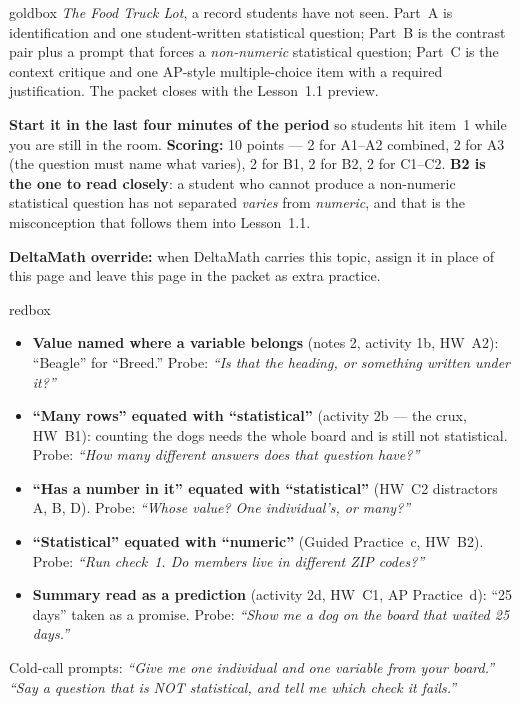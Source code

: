 \documentclass[10pt]{article}
\begin{document}
\boxguard
\begin{skillbox}{goldbox}
\emph{The Food Truck Lot}, a record students have not seen. Part~A is identification and one
student-written statistical question; Part~B is the contrast pair plus a prompt that forces a
\emph{non-numeric} statistical question; Part~C is the context critique and one AP-style
multiple-choice item with a required justification. The packet closes with the Lesson~1.1
preview.

\textbf{Start it in the last four minutes of the period} so students hit item~1 while you are
still in the room. \textbf{Scoring:} 10 points --- 2 for A1--A2 combined, 2 for A3
(the question must name what varies), 2 for B1, 2 for B2, 2 for C1--C2. \textbf{B2 is the
one to read closely}: a student who cannot produce a non-numeric statistical question has not
separated \emph{varies} from \emph{numeric}, and that is the misconception that follows them
into Lesson~1.1.

\textbf{DeltaMath override:} when DeltaMath carries this topic, assign it in place of this page
and leave this page in the packet as extra practice.
\end{skillbox}

\boxguard
\begin{skillbox}{redbox}
\begin{itemize}[leftmargin=1.2em, nosep]
  \item \textbf{Value named where a variable belongs} (notes 2, activity 1b, HW~A2): ``Beagle''
        for ``Breed.'' Probe: \emph{``Is that the heading, or something written under it?''}
  \item \textbf{``Many rows'' equated with ``statistical''} (activity 2b --- the crux, HW~B1):
        counting the dogs needs the whole board and is still not statistical. Probe:
        \emph{``How many different answers does that question have?''}
  \item \textbf{``Has a number in it'' equated with ``statistical''} (HW~C2 distractors A, B, D).
        Probe: \emph{``Whose value? One individual's, or many?''}
  \item \textbf{``Statistical'' equated with ``numeric''} (Guided Practice~c, HW~B2). Probe:
        \emph{``Run check~1. Do members live in different ZIP codes?''}
  \item \textbf{Summary read as a prediction} (activity 2d, HW~C1, AP Practice~d): ``25 days''
        taken as a promise. Probe: \emph{``Show me a dog on the board that waited 25 days.''}
\end{itemize}
Cold-call prompts: \emph{``Give me one individual and one variable from your board.''} \quad
\emph{``Say a question that is NOT statistical, and tell me which check it fails.''}
\end{skillbox}
\end{document}
